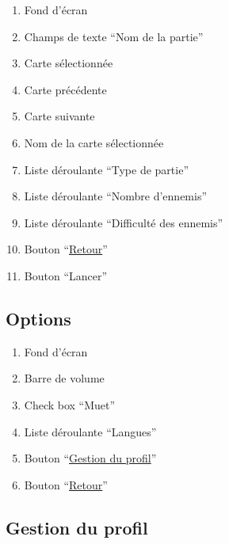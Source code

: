 \documentclass{report}
\begin{document}
		\hypertarget{Creer partie multi-joueurs}{}
		\label{Creer partie multi-joueurs}
	
		
		
		\begin{enumerate}
		  \item Fond d'écran
		  \item Champs de texte ``Nom de la partie''
		  \item Carte sélectionnée
		  \item Carte précédente
		  \item Carte suivante
		  \item Nom de la carte sélectionnée
		  \item Liste déroulante ``Type de partie''
		  \item Liste déroulante ``Nombre d'ennemis''
		  \item Liste déroulante ``Difficulté des ennemis''
		  \item Bouton ``\hyperlink{Page d'accueil}{Retour}''
		  \item Bouton ``Lancer'' 
		\end{enumerate}
	
	
\newpage

	\subsection{Options}
	
		\hypertarget{Options}{}
		\label{Options}
	
		
		
		\begin{enumerate}
		  \item Fond d'écran
		  \item Barre de volume
		  \item Check box ``Muet''
		  \item Liste déroulante ``Langues''
		  \item Bouton ``\hyperlink{Page d'accueil}{Gestion du profil}''
		  \item Bouton ``\hyperlink{Page d'accueil}{Retour}''
		\end{enumerate}

	
\newpage

	\subsection{Gestion du profil}
	
		\hypertarget{Gestion du profil}{}
		\label{Gestion du profil}
		
\end{document}
